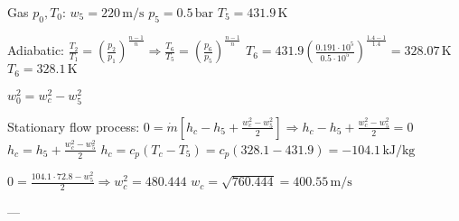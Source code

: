 Gas \( p_0, T_0 \):  
\( w_5 = 220 \, \text{m/s} \)  
\( p_5 = 0.5 \, \text{bar} \)  
\( T_5 = 431.9 \, \text{K} \)  

Adiabatic:  
\( \frac{T_2}{T_1} = \left( \frac{p_2}{p_1} \right)^{\frac{n-1}{n}} \Rightarrow \frac{T_6}{T_5} = \left( \frac{p_6}{p_5} \right)^{\frac{n-1}{n}} \)  
\( T_6 = 431.9 \left( \frac{0.191 \cdot 10^5}{0.5 \cdot 10^5} \right)^{\frac{1.4-1}{1.4}} = 328.07 \, \text{K} \)  
\( T_6 = 328.1 \, \text{K} \)  

\( w_0^2 = w_c^2 - w_5^2 \)  

Stationary flow process:  
\( 0 = \dot{m} \left[ h_c - h_5 + \frac{w_c^2 - w_5^2}{2} \right] \Rightarrow h_c - h_5 + \frac{w_c^2 - w_5^2}{2} = 0 \)  
\( h_c = h_5 + \frac{w_c^2 - w_5^2}{2} \)  
\( h_c = c_p \left( T_c - T_5 \right) = c_p \left( 328.1 - 431.9 \right) = -104.1 \, \text{kJ/kg} \)  

\( 0 = \frac{104.1 \cdot 72.8 - w_5^2}{2} \Rightarrow w_c^2 = 480.444 \)  
\( w_c = \sqrt{760.444} = 400.55 \, \text{m/s} \)

---